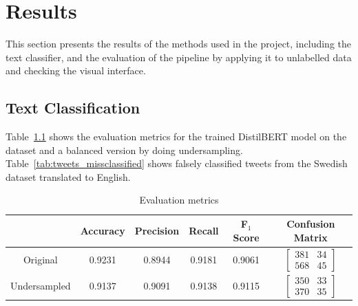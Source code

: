 \chapter{Results}

This section presents the results of the methods used in the project, including the text classifier,
and the evaluation of the pipeline by applying it to unlabelled data and checking the visual
interface.


\section{Text Classification}
Table~\ref{tab:metrics} shows the evaluation metrics for the trained DistilBERT model on the dataset
and a balanced version by doing undersampling. Table~\ref{tab:tweets_missclassified} shows falsely
classified tweets from the Swedish dataset translated to English.

\begin{table}
      \center
      \bgroup
      \def\arraystretch{1.5}
  \begin{tabular}{|c|c|c|c|c|c|}
    \hline
            & Accuracy & Precision & Recall & F$_1$ Score & Confusion Matrix\\
    \hline
    Original & 0.9231 & 0.8944 & 0.9181 & 0.9061 &
    $
    \begin{bmatrix}
      381 & 34 \\ 
      568 & 45
\end{bmatrix}
$\\
    \hline
    Undersampled & 0.9137 & 0.9091 & 0.9138 & 0.9115 &
    $
    \begin{bmatrix}
      350 & 33\\ 
      370 & 35
    \end{bmatrix}
    $\\
    \hline
  \end{tabular}
      \egroup
      \caption{Evaluation metrics}
      \label{tab:metrics}
\end{table}

